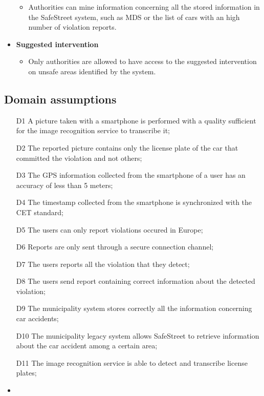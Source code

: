 \begin{itemize}
\begin{itemize}
            \item Authorities can mine information concerning all the stored information in the SafeStreet system, such as MDS or the list of cars with an high number of violation reports.
        \end{itemize}
    \item \textbf{Suggested intervention}
        \begin{itemize}
            \item Only authorities are allowed to have access to the suggested intervention on unsafe areas identified by the system.
        \end{itemize}
    \end{itemize}
\subsection{Domain assumptions}
\begin{itemize}
    \item [D1]  A picture taken with a smartphone is performed with a quality sufficient for the image recognition service to transcribe it;
    \item [D2]  The reported picture contains only the license plate of the car that committed the violation and not others;
    \item [D3]  The GPS information collected from the smartphone of a user has an accuracy of less than 5 meters;
    \item [D4]  The timestamp collected from the smartphone is synchronized with the CET standard;
    \item [D5]  The users can only report violations occured in Europe;
    \item [D6]  Reports are only sent through a secure connection channel;
    \item [D7]  The users reports all the violation that they detect;
    \item [D8]  The users send report containing correct information about the detected violation;
    \item [D9]  The municipality system stores correctly all the information concerning car accidents;
    \item [D10] The municipality legacy system allows SafeStreet to retrieve information about the car accident among a certain area;
    \item [D11] The image recognition service is able to detect and transcribe license plates;
    \item 
\end{itemize}

